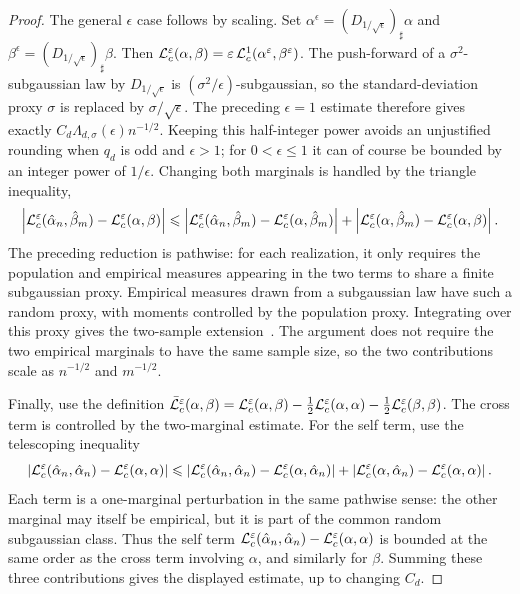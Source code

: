 \begin{proof}
	The general \(\epsilon\) case follows by scaling. Set \(\alpha^\epsilon=(D_{1/\sqrt\epsilon})_\sharp\alpha\) and \(\beta^\epsilon=(D_{1/\sqrt\epsilon})_\sharp\beta\). Then
	$\mathcal{L}_c^\varepsilon(\alpha,\beta) = \varepsilon\,\mathcal{L}_c^1(\alpha^\varepsilon,\beta^\varepsilon)$.
	The push-forward of a \(\sigma^2\)-subgaussian law by \(D_{1/\sqrt\epsilon}\) is \((\sigma^2/\epsilon)\)-subgaussian, so the standard-deviation proxy \(\sigma\) is replaced by \(\sigma/\sqrt\epsilon\). The preceding \(\epsilon=1\) estimate therefore gives exactly \(C_d\Lambda_{d,\sigma}(\epsilon)n^{-1/2}\). Keeping this half-integer power avoids an unjustified rounding when $q_d$ is odd and $\epsilon>1$; for $0<\epsilon\leq1$ it can of course be bounded by an integer power of $1/\epsilon$.
	Changing both marginals is handled by the triangle inequality,
	\[
	\left\lvert\mathcal{L}_c^\varepsilon(\hat\alpha_n,\hat\beta_m)-\mathcal{L}_c^\varepsilon(\alpha,\beta)\right\rvert
	\leqslant
	\left\lvert\mathcal{L}_c^\varepsilon(\hat\alpha_n,\hat\beta_m)-\mathcal{L}_c^\varepsilon(\alpha,\hat\beta_m)\right\rvert
	+
	\left\lvert\mathcal{L}_c^\varepsilon(\alpha,\hat\beta_m)-\mathcal{L}_c^\varepsilon(\alpha,\beta)\right\rvert.
	\]
	The preceding reduction is pathwise: for each realization, it only requires the population and empirical measures appearing in the two terms to share a finite subgaussian proxy. Empirical measures drawn from a subgaussian law have such a random proxy, with moments controlled by the population proxy. Integrating over this proxy gives the two-sample extension~\cite{mena2019statistical}. The argument does not require the two empirical marginals to have the same sample size, so the two contributions scale as \(n^{-1/2}\) and \(m^{-1/2}\).

	Finally, use the definition
	$\bar{\mathcal{L}}_c^\varepsilon(\alpha,\beta) = \mathcal{L}_c^\varepsilon(\alpha,\beta) -\frac12\mathcal{L}_c^\varepsilon(\alpha,\alpha) -\frac12\mathcal{L}_c^\varepsilon(\beta,\beta)$.
	The cross term is controlled by the two-marginal estimate. For the self term, use the telescoping inequality
	\[
		\left\lvert\mathcal{L}_c^\varepsilon(\hat\alpha_n,\hat\alpha_n)-\mathcal{L}_c^\varepsilon(\alpha,\alpha)\right\rvert
		\leqslant
		\left\lvert\mathcal{L}_c^\varepsilon(\hat\alpha_n,\hat\alpha_n)-\mathcal{L}_c^\varepsilon(\alpha,\hat\alpha_n)\right\rvert
		+
		\left\lvert\mathcal{L}_c^\varepsilon(\alpha,\hat\alpha_n)-\mathcal{L}_c^\varepsilon(\alpha,\alpha)\right\rvert.
	\]
	Each term is a one-marginal perturbation in the same pathwise sense: the other marginal may itself be empirical, but it is part of the common random subgaussian class. Thus the self term
	\(\mathcal{L}_c^\varepsilon(\hat\alpha_n,\hat\alpha_n)-\mathcal{L}_c^\varepsilon(\alpha,\alpha)\)
	is bounded at the same order as the cross term involving \(\alpha\), and similarly for \(\beta\). Summing these three contributions gives the displayed estimate, up to changing \(C_d\).
\end{proof}


